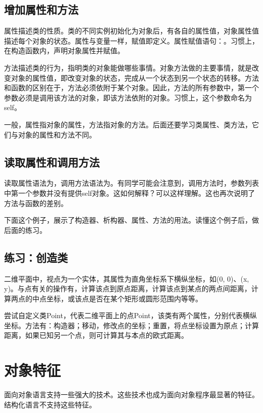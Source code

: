 \subsection{增加属性和方法}
属性描述类的性质。类的不同实例初始化为对象后，有各自的属性值，对象属性值描述每个对象的状态。属性与变量一样，赋值即定义。属性赋值语句：。习惯上，在构造函数内，声明对象属性并赋值。

方法描述类的行为，指明类的对象能做哪些事情。对象方法做的主要事情，就是改变对象的属性值，即改变对象的状态，完成从一个状态到另一个状态的转移。方法和函数的区别在于，方法必须依附于某个对象。因此，方法的所有参数中，第一个参数必须是调用该方法的对象，即该方法依附的对象。习惯上，这个参数命名为self。

一般，属性指对象的属性，方法指对象的方法。后面还要学习类属性、类方法，它们与对象的属性和方法不同。
\subsection{读取属性和调用方法}
读取属性语法为，调用方法语法为。有同学可能会注意到，调用方法时，参数列表中第一个参数并没有提供self对象。这如何解释？可以这样理解。这也再次说明了方法与函数的差别。

下面这个例子，展示了构造器、析构器、属性、方法的用法。读懂这个例子后，做后面的练习。
\subsection{练习：创造类}  
二维平面中，视点为一个实体，其属性为直角坐标系下横纵坐标，如(0, 0)、(x, y)。与点有关的操作有，计算该点到原点距离，计算该点到某点的两点间距离，计算两点的中点坐标，或该点是否在某个矩形或圆形范围内等等。

尝试自定义类Point，代表二维平面上的点Point，该类有两个属性，分别代表横纵坐标。方法有：构造器；移动，修改点的坐标；重置，将点坐标设置为原点；计算距离，如果已知另一个点，则可计算其与本点的欧式距离。

\section{对象特征}
面向对象语言支持一些强大的技术。这些技术也成为面向对象程序最显著的特征。结构化语言不支持这些特征。
